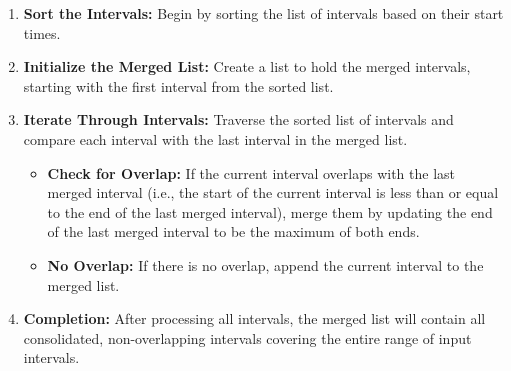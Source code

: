 \begin{enumerate}
    \item \textbf{Sort the Intervals:} Begin by sorting the list of intervals based on their start times.
    
    \item \textbf{Initialize the Merged List:} Create a list to hold the merged intervals, starting with the first interval from the sorted list.
    
    \item \textbf{Iterate Through Intervals:} Traverse the sorted list of intervals and compare each interval with the last interval in the merged list.
        \begin{itemize}
            \item \textbf{Check for Overlap:} If the current interval overlaps with the last merged interval (i.e., the start of the current interval is less than or equal to the end of the last merged interval), merge them by updating the end of the last merged interval to be the maximum of both ends.
            
            \item \textbf{No Overlap:} If there is no overlap, append the current interval to the merged list.
        \end{itemize}
    
    \item \textbf{Completion:} After processing all intervals, the merged list will contain all consolidated, non-overlapping intervals covering the entire range of input intervals.
\end{enumerate}

